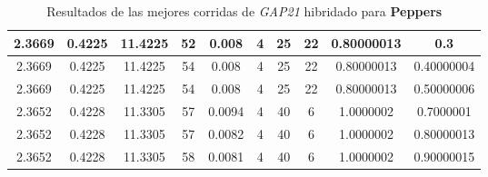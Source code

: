 \begin{table}[h!]
\begin{center}
\begin{tabular}{|c|c|c|c|c|c|c|c|c|c|}
        \hline
        \hline
            2.3669 & 0.4225  & 11.4225 & 52 & 0.008 & 4 & 25 & 22 & 0.80000013 & 0.3\\
        \hline
        \hline
            2.3669 & 0.4225  & 11.4225 & 54 & 0.008 & 4 & 25 & 22 & 0.80000013 & 0.40000004\\
        \hline
        \hline
            2.3669 & 0.4225  & 11.4225 & 54 & 0.008 & 4 & 25 & 22 & 0.80000013 & 0.50000006\\
        \hline
        \hline
            2.3652 & 0.4228  & 11.3305 & 57 & 0.0094 & 4 & 40 & 6 & 1.0000002 & 0.7000001\\
        \hline
        \hline
            2.3652 & 0.4228  & 11.3305 & 57 & 0.0082 & 4 & 40 & 6 & 1.0000002 & 0.80000013\\
        \hline
        \hline
            2.3652 & 0.4228  & 11.3305 & 58 & 0.0081 & 4 & 40 & 6 & 1.0000002 & 0.90000015\\
        \hline
        \end{tabular}
        \caption{Resultados de las mejores corridas de \emph{GAP21} hibridado para {\bf Peppers}}
        \label{tb:tableGAP21}
    \end{center}
\end{table}
